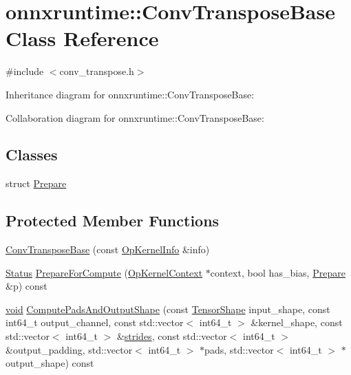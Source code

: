 \hypertarget{classonnxruntime_1_1ConvTransposeBase}{}\section{onnxruntime\+:\+:Conv\+Transpose\+Base Class Reference}
\label{classonnxruntime_1_1ConvTransposeBase}


{\ttfamily \#include $<$conv\+\_\+transpose.\+h$>$}



Inheritance diagram for onnxruntime\+:\+:Conv\+Transpose\+Base\+:


Collaboration diagram for onnxruntime\+:\+:Conv\+Transpose\+Base\+:
\subsection*{Classes}
\begin{DoxyCompactItemize}
\item 
struct \mbox{\hyperlink{structonnxruntime_1_1ConvTransposeBase_1_1Prepare}{Prepare}}
\end{DoxyCompactItemize}
\subsection*{Protected Member Functions}
\begin{DoxyCompactItemize}
\item 
\mbox{\hyperlink{classonnxruntime_1_1ConvTransposeBase_a48c752373100fe1f75d3e609de6cc844}{Conv\+Transpose\+Base}} (const \mbox{\hyperlink{classonnxruntime_1_1OpKernelInfo}{Op\+Kernel\+Info}} \&info)
\item 
\mbox{\hyperlink{classonnxruntime_1_1common_1_1Status}{Status}} \mbox{\hyperlink{classonnxruntime_1_1ConvTransposeBase_ab2d71cbaa44e9f6ee1437e319ebb191a}{Prepare\+For\+Compute}} (\mbox{\hyperlink{classonnxruntime_1_1OpKernelContext}{Op\+Kernel\+Context}} $\ast$context, bool has\+\_\+bias, \mbox{\hyperlink{structonnxruntime_1_1ConvTransposeBase_1_1Prepare}{Prepare}} \&p) const
\item 
\mbox{\hyperlink{mlasi_8h_a88f941d423cb2a819b70a1358982b1a6}{void}} \mbox{\hyperlink{classonnxruntime_1_1ConvTransposeBase_a35d55f24a17b9b296359aeb5e8bdfc44}{Compute\+Pads\+And\+Output\+Shape}} (const \mbox{\hyperlink{classonnxruntime_1_1TensorShape}{Tensor\+Shape}} input\+\_\+shape, const int64\+\_\+t output\+\_\+channel, const std\+::vector$<$ int64\+\_\+t $>$ \&kernel\+\_\+shape, const std\+::vector$<$ int64\+\_\+t $>$ \&\mbox{\hyperlink{mkldnn_2nn_2pool_8cc_abdced837e2fca213b15df1588e8782c4}{strides}}, const std\+::vector$<$ int64\+\_\+t $>$ \&output\+\_\+padding, std\+::vector$<$ int64\+\_\+t $>$ $\ast$pads, std\+::vector$<$ int64\+\_\+t $>$ $\ast$output\+\_\+shape) const
\end{DoxyCompactItemize}
